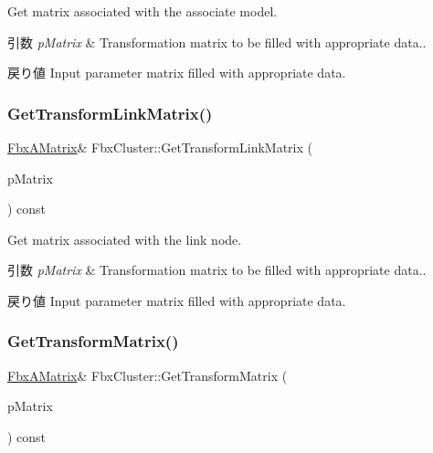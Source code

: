 Get matrix associated with the associate model. 
\begin{DoxyParams}{引数}
{\em p\+Matrix} & Transformation matrix to be filled with appropriate data.. \\
\hline
\end{DoxyParams}
\begin{DoxyReturn}{戻り値}
Input parameter matrix filled with appropriate data. 
\end{DoxyReturn}
\mbox{\label{class_fbx_cluster_a6a45e225e66240b14af3f6543141119b}} 
\subsubsection{\texorpdfstring{Get\+Transform\+Link\+Matrix()}{GetTransformLinkMatrix()}}
{\footnotesize\ttfamily \hyperlink{class_fbx_a_matrix}{Fbx\+A\+Matrix}\& Fbx\+Cluster\+::\+Get\+Transform\+Link\+Matrix (\begin{DoxyParamCaption}\item[{\hyperlink{class_fbx_a_matrix}{Fbx\+A\+Matrix} \&}]{p\+Matrix }\end{DoxyParamCaption}) const}

Get matrix associated with the link node. 
\begin{DoxyParams}{引数}
{\em p\+Matrix} & Transformation matrix to be filled with appropriate data.. \\
\hline
\end{DoxyParams}
\begin{DoxyReturn}{戻り値}
Input parameter matrix filled with appropriate data. 
\end{DoxyReturn}
\mbox{\label{class_fbx_cluster_a6da90436aeb9b7eeaefafff3bc617206}} 
\subsubsection{\texorpdfstring{Get\+Transform\+Matrix()}{GetTransformMatrix()}}
{\footnotesize\ttfamily \hyperlink{class_fbx_a_matrix}{Fbx\+A\+Matrix}\& Fbx\+Cluster\+::\+Get\+Transform\+Matrix (\begin{DoxyParamCaption}\item[{\hyperlink{class_fbx_a_matrix}{Fbx\+A\+Matrix} \&}]{p\+Matrix }\end{DoxyParamCaption}) const}

